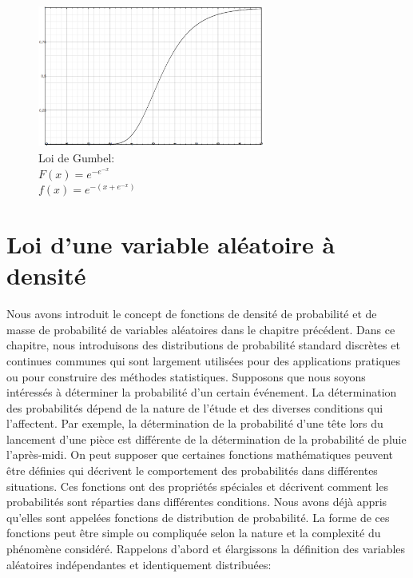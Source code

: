 {\begin{figure}[h]
\centering
\includegraphics[width=7.5cm]{content/gumbel.PNG}
\caption{Loi de Gumbel:\\$F(x)=e^{-e^{-x}}$\\$f(x)=e^{-(x+e^{-x})}$ }
\end{figure}



















\iffalse
\section{Loi d’une variable aléatoire à densité}\label{chap:2}
Nous avons introduit le concept de fonctions de densité de probabilité et de masse de probabilité de variables aléatoires
dans le chapitre précédent. Dans ce chapitre, nous introduisons des distributions de probabilité standard discrètes et
continues communes qui sont largement utilisées pour des applications pratiques ou pour construire des méthodes
statistiques. Supposons que nous soyons intéressés à déterminer la probabilité d'un certain événement. La détermination
des probabilités dépend de la nature de l’étude et des diverses conditions qui l’affectent. Par exemple, la détermination
de la probabilité d'une tête lors du lancement d'une pièce est différente de la détermination de la probabilité de pluie
l'après-midi. On peut supposer que certaines fonctions mathématiques peuvent être définies qui décrivent le comportement
des probabilités dans différentes situations. Ces fonctions ont des propriétés spéciales et décrivent comment les
probabilités sont réparties dans différentes conditions. Nous avons déjà appris qu'elles sont appelées fonctions de
distribution de probabilité. La forme de ces fonctions peut être simple ou compliquée selon la nature et la complexité du
phénomène considéré. Rappelons d'abord et élargissons la définition des variables aléatoires indépendantes et
identiquement distribuées:

}
